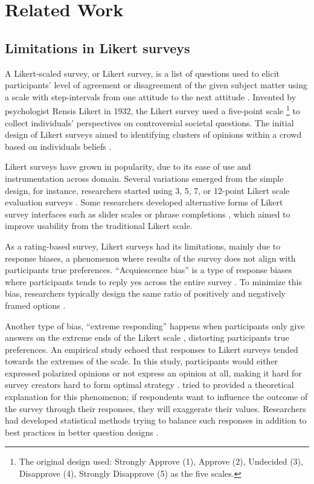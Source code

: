 \section{Related Work} \label{related_works}

\subsection{Limitations in Likert surveys}
A Likert-scaled survey, or Likert survey, is a list of questions used to elicit participants' level of agreement or disagreement of the given subject matter using a scale with step-intervals from one attitude to the next attitude \cite{likert1932technique}. Invented by psychologist Rensis Likert in 1932, the Likert survey used a five-point scale \footnote{The original design used: Strongly Approve (1), Approve (2), Undecided (3), Disapprove (4), Strongly Disapprove (5) as the five scales.} to collect individuals' perspectives on controversial societal questions. The initial design of Likert surveys aimed to identifying clusters of opinions within a crowd based on individuals beliefs \cite{joshi2015likert}. 

Likert surveys have grown in popularity, due to its ease of use and instrumentation across domain. Several variations emerged from the simple design, for instance, researchers started using 3, 5, 7, or  12-point Likert scale evaluation surveys \cite{garland2008computer,finstad2010}. Some researchers developed alternative forms of Likert survey interfaces such as slider scales \cite{roster2015exploring} or phrase completions \cite{hodge2003phrase}, which aimed to improve usability from the traditional Likert scale. 

As a rating-based survey, Likert surveys had its limitations, mainly due to response biases, a phenomenon where results of the survey does not align with participants true preferences. ``Acquiescence bias'' is a type of response biases where participants tends to reply yes across the entire survey \cite{alwin1985measurement, moors2016two}. To minimize this bias, researchers typically design the same ratio of positively and negatively framed options \cite{kuru2016improving}. 

Another type of bias, ``extreme responding'' happens when participants only give answers on the extreme ends of the Likert scale \cite{batchelor2016extreme, furnham1986response, meisenberg2008acquiescent}, distorting participants true preferences. An empirical study \cite{quarfoot2017quadratic} echoed that responses to Likert surveys tended towards the extremes of the scale. In this study, participants would either expressed polarized opinions or not express an opinion at all, making it hard for survey creators hard to form optimal strategy \cite{posner2018radical}. \textcite{cavaille2018towards} tried to provided a theoretical explanation for this phenomenon; if respondents want to influence the outcome of the survey through their responses, they will exaggerate their values. Researchers had developed statistical methods trying to balance such responses in addition to best practices in better question designs \cite{glaser2008response}.

